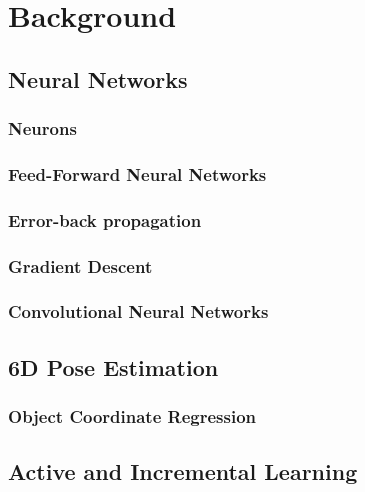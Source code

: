 \chapter{Background} \label{background}

\section{Neural Networks}

\subsection{Neurons}

\subsection{Feed-Forward Neural Networks}

\subsection{Error-back propagation}

\subsection{Gradient Descent}

\subsection{Convolutional Neural Networks}

\section{6D Pose Estimation}

\subsection{Object Coordinate Regression} \label{objectcoordinates}

\section{Active and Incremental Learning}